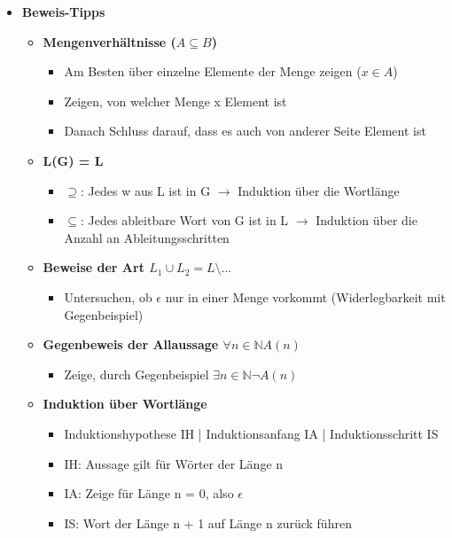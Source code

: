 \documentclass[11pt,a4paper]{article}
\begin{document}
\begin{itemize}
\begin{itemize}
	\end{itemize}
	
	
\item {\large \textbf{Beweis-Tipps}}
	\begin{itemize}
	
	\item \textbf{Mengenverhältnisse ($A \subseteq B$)}
		\begin{itemize}
		\item Am Besten über einzelne Elemente der Menge zeigen ($x \in A$)
		\item Zeigen, von welcher Menge x Element ist
		\item Danach Schluss darauf, dass es auch von anderer Seite Element ist
		\end{itemize}		
		
	
	\item \textbf{L(G) = L}
		\begin{itemize}
		\item $\supseteq$: Jedes w aus L ist in G $\rightarrow$ Induktion über die Wortlänge
		\item $\subseteq$: Jedes ableitbare Wort von G ist in L $\rightarrow$ Induktion über die Anzahl an Ableitungsschritten
		\end{itemize}
	
	\item \textbf{Beweise der Art $L_1 \cup L_2 = L \setminus ...$}
		\begin{itemize}
		\item Untersuchen, ob $\epsilon$ nur in einer Menge vorkommt (Widerlegbarkeit mit Gegenbeispiel)
		\end{itemize}
		
	\item \textbf{Gegenbeweis der Allaussage $\forall n \in \mathbb{N} A(n)$}
		\begin{itemize}
		\item Zeige, durch Gegenbeispiel $\exists n \in \mathbb{N} \lnot A(n)$
		\end{itemize}
		
	\item \textbf{Induktion über Wortlänge}
		\begin{itemize}
		\item Induktionshypothese IH | Induktionsanfang IA | Induktionsschritt IS
		\item IH: Aussage gilt für Wörter der Länge n
		\item IA: Zeige für Länge n = 0, also $\epsilon$
		\item IS: Wort der Länge n + 1 auf Länge n zurück führen
		\end{itemize}		
	

\end{itemize}
\end{itemize}
\end{document}
